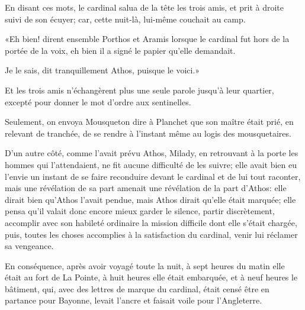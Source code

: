 En disant ces mots, le cardinal salua de la tête les trois amis, et prit à droite suivi de son écuyer; car, cette nuit-là, lui-même couchait au camp. 

«Eh bien! dirent ensemble Porthos et Aramis lorsque le cardinal fut hors de la portée de la voix, eh bien il a signé le papier qu'elle demandait. 

\speak  Je le sais, dit tranquillement Athos, puisque le voici.» 

Et les trois amis n'échangèrent plus une seule parole jusqu'à leur quartier, excepté pour donner le mot d'ordre aux sentinelles. 

Seulement, on envoya Mousqueton dire à Planchet que son maître était prié, en relevant de tranchée, de se rendre à l'instant même au logis des mousquetaires. 

D'un autre côté, comme l'avait prévu Athos, Milady, en retrouvant à la porte les hommes qui l'attendaient, ne fit aucune difficulté de les suivre; elle avait bien eu l'envie un instant de se faire reconduire devant le cardinal et de lui tout raconter, mais une révélation de sa part amenait une révélation de la part d'Athos: elle dirait bien qu'Athos l'avait pendue, mais Athos dirait qu'elle était marquée; elle pensa qu'il valait donc encore mieux garder le silence, partir discrètement, accomplir avec son habileté ordinaire la mission difficile dont elle s'était chargée, puis, toutes les choses accomplies à la satisfaction du cardinal, venir lui réclamer sa vengeance. 

En conséquence, après avoir voyagé toute la nuit, à sept heures du matin elle était au fort de La Pointe, à huit heures elle était embarquée, et à neuf heures le bâtiment, qui, avec des lettres de marque du cardinal, était censé être en partance pour Bayonne, levait l'ancre et faisait voile pour l'Angleterre.